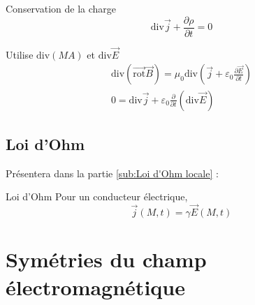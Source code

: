 \begin{Prop}{Conservation de la charge}{}
  \begin{equation}
    \mathrm{div} \overrightarrow{j} + \frac{\partial \rho}{\partial t}  = 0
  \end{equation}

\end{Prop}
\begin{myproof}{}{} Utilise $\mathrm{div}(MA)$ et $\mathrm{div} \overrightarrow{E}$
\begin{gather}
 \mathrm{div} (\overrightarrow{\mathrm{rot}}\overrightarrow{B}) = \mu_0 \mathrm{div} \left( \overrightarrow{j} + \varepsilon_0 \frac{\partial \overrightarrow{E}}{\partial t}  \right) \\ 
  0 = \mathrm{div} \overrightarrow{j} + \varepsilon_0 \frac{\partial }{\partial t} (\mathrm{div} \overrightarrow{E} )
\end{gather}
\end{myproof}

\subsection{Loi d'Ohm} %
\label{sub:Loi d'Ohm}

Présentera dans la partie \ref{sub:Loi d'Ohm locale} :

\begin{Theorem}{Loi d'Ohm}{}
Pour un conducteur électrique, 
\begin{equation}
  \overrightarrow{j}(M,t) = \gamma \overrightarrow{E}(M,t)
\end{equation}
\end{Theorem}

\newpage
\section{Symétries du champ électromagnétique} %
\label{sec:Symétries du champ électromagnétique}

